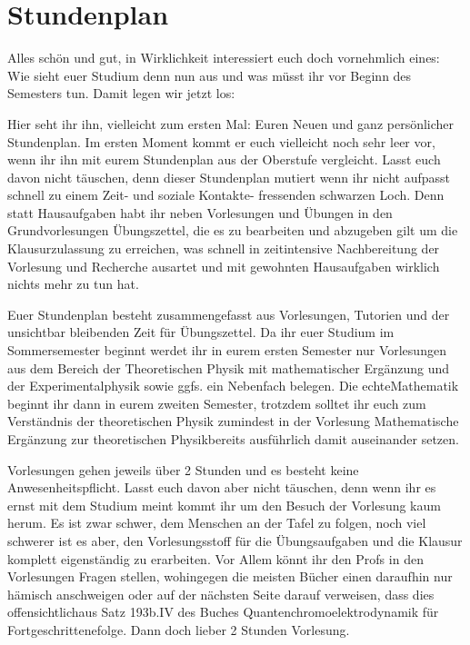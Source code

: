 \section{Stundenplan}

Alles schön und gut, in Wirklichkeit interessiert euch doch vornehmlich eines: Wie sieht euer Studium denn nun aus und was müsst ihr vor Beginn des Semesters tun. Damit legen wir jetzt los:

Hier seht ihr ihn, vielleicht zum ersten Mal: Euren Neuen und ganz persönlicher Stundenplan. Im ersten Moment kommt er euch vielleicht noch sehr leer vor, wenn ihr ihn mit eurem Stundenplan aus der Oberstufe vergleicht.
Lasst euch davon nicht täuschen, denn dieser Stundenplan mutiert wenn ihr nicht aufpasst schnell zu einem Zeit- und soziale Kontakte- fressenden schwarzen Loch. Denn statt Hausaufgaben habt ihr neben Vorlesungen und Übungen in den Grundvorlesungen Übungszettel, die es zu bearbeiten und abzugeben gilt um die Klausurzulassung zu erreichen, was schnell in zeitintensive Nachbereitung der Vorlesung und Recherche ausartet und mit gewohnten Hausaufgaben wirklich nichts mehr zu tun hat.

Euer Stundenplan besteht zusammengefasst aus Vorlesungen, Tutorien und der unsichtbar bleibenden Zeit für Übungszettel. 
Da ihr euer Studium im Sommersemester beginnt werdet ihr in eurem ersten Semester nur Vorlesungen aus dem Bereich der Theoretischen Physik mit mathematischer Ergänzung und der Experimentalphysik sowie ggfs. ein Nebenfach belegen. Die 
\glqq echte\grqq  Mathematik beginnt ihr dann in eurem zweiten Semester, trotzdem solltet ihr euch zum Verständnis der theoretischen Physik zumindest in der Vorlesung \glqq Mathematische Ergänzung zur theoretischen Physik\grqq   bereits ausführlich damit auseinander setzen. 

Vorlesungen gehen jeweils über 2 Stunden und es besteht keine Anwesenheitspflicht. Lasst euch davon aber nicht täuschen, denn wenn ihr es ernst mit dem Studium meint kommt ihr um den Besuch der Vorlesung kaum herum. Es ist zwar schwer, dem Menschen an der Tafel zu folgen, noch viel schwerer ist es aber, den Vorlesungsstoff für die Übungsaufgaben und die Klausur komplett eigenständig zu erarbeiten. Vor Allem könnt ihr den Profs in den Vorlesungen Fragen stellen, wohingegen die meisten Bücher einen daraufhin nur hämisch anschweigen oder auf der nächsten Seite darauf verweisen, dass dies \glqq offensichtlich\grqq   aus Satz 193b.IV des Buches \glqq Quantenchromoelektrodynamik für Fortgeschrittene\grqq   folge. Dann doch lieber 2 Stunden Vorlesung.

